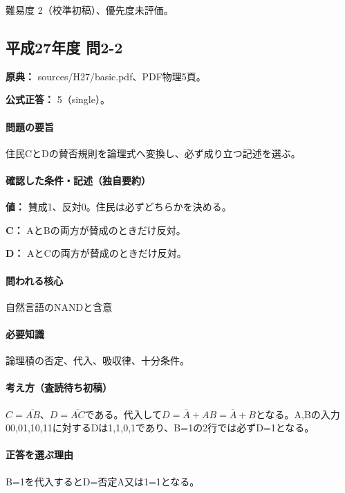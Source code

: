 \par 難易度 2（校準初稿）、優先度未評価。

\subsection{平成27年度 問2-2}
\label{q:h27-reg-basic-2-2}

\noindent\textbf{原典：} sources/H27/basic.pdf、PDF物理5頁。

\textbf{公式正答：} 5（single）。

\paragraph{問題の要旨} 住民CとDの賛否規則を論理式へ変換し、必ず成り立つ記述を選ぶ。

\paragraph{確認した条件・記述（独自要約）}\mbox{}\par

\noindent\textbf{値：} 賛成1、反対0。住民は必ずどちらかを決める。\par

\noindent\textbf{C：} AとBの両方が賛成のときだけ反対。\par

\noindent\textbf{D：} AとCの両方が賛成のときだけ反対。\par

\paragraph{問われる核心} 自然言語のNANDと含意

\paragraph{必要知識} 論理積の否定、代入、吸収律、十分条件。

\paragraph{考え方（査読待ち初稿）} \(C=\overline{AB}\)、\(D=\overline{AC}\)である。代入して\(D=\overline A+AB=\overline A+B\)となる。A,Bの入力00,01,10,11に対するDは1,1,0,1であり、B=\allowbreak{}1の2行では必ずD=\allowbreak{}1となる。

\paragraph{正答を選ぶ理由} B=\allowbreak{}1を代入するとD=否定A又は1=\allowbreak{}1となる。

